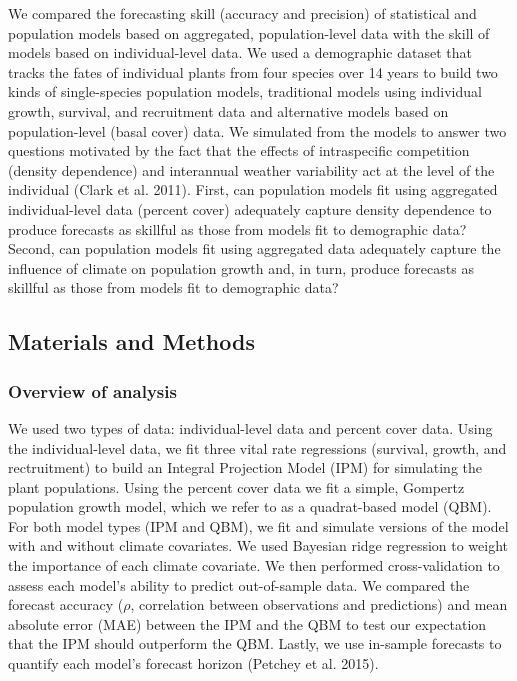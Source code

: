 \documentclass[12pt,]{article}
\begin{document}
We compared the forecasting skill (accuracy and precision) of
statistical and population models based on aggregated, population-level
data with the skill of models based on individual-level data. We used a
demographic dataset that tracks the fates of individual plants from four
species over 14 years to build two kinds of single-species population
models, traditional models using individual growth, survival, and
recruitment data and alternative models based on population-level (basal
cover) data. We simulated from the models to answer two questions
motivated by the fact that the effects of intraspecific competition
(density dependence) and interannual weather variability act at the
level of the individual (Clark et al. 2011). First, can population
models fit using aggregated individual-level data (percent cover)
adequately capture density dependence to produce forecasts as skillful
as those from models fit to demographic data? Second, can population
models fit using aggregated data adequately capture the influence of
climate on population growth and, in turn, produce forecasts as skillful
as those from models fit to demographic data?

\subsection{Materials and Methods}\label{materials-and-methods}

\subsubsection{Overview of analysis}\label{overview-of-analysis}

We used two types of data: individual-level data and percent cover data.
Using the individual-level data, we fit three vital rate regressions
(survival, growth, and rectruitment) to build an Integral Projection
Model (IPM) for simulating the plant populations. Using the percent
cover data we fit a simple, Gompertz population growth model, which we
refer to as a quadrat-based model (QBM). For both model types (IPM and
QBM), we fit and simulate versions of the model with and without climate
covariates. We used Bayesian ridge regression to weight the importance
of each climate covariate. We then performed cross-validation to assess
each model's ability to predict out-of-sample data. We compared the
forecast accuracy (\(\rho\), correlation between observations and
predictions) and mean absolute error (MAE) between the IPM and the QBM
to test our expectation that the IPM should outperform the QBM. Lastly,
we use in-sample forecasts to quantify each model's forecast horizon
(Petchey et al. 2015).
\end{document}
